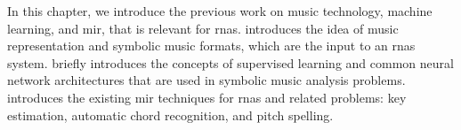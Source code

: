

In this chapter, we introduce the previous work on music
technology, machine learning, and \gls{mir}, that is
relevant for \glspl{rna}. 
introduces the idea of music representation and symbolic
music formats, which are the input to an \glspl{rna} system.
 briefly introduces the concepts
of supervised learning and common neural network
architectures that are used in symbolic music analysis
problems.  introduces the
existing \gls{mir} techniques for \glspl{rna} and related
problems: key estimation, automatic chord recognition, and
pitch spelling.

